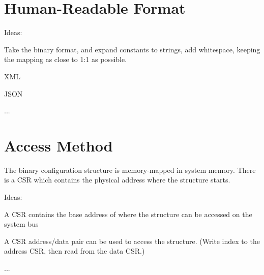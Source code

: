 \chapter{Human-Readable Format}

\begin{steps}{Ideas:}
\item Take the binary format, and expand constants to strings, add whitespace,
keeping the mapping as close to 1:1 as possible.
\item XML
\item JSON
\item ...
\end{steps}

\chapter{Access Method}
\label{sec:AccessMethod}

The binary configuration structure is memory-mapped in system memory. There
is a CSR which contains the physical address where the structure starts.

\begin{steps}{Ideas:}
\item A CSR contains the base address of where the structure can be accessed on
the system bus
\item A CSR address/data pair can be used to access the structure. (Write index
to the address CSR, then read from the data CSR.)
\item ...
\end{steps}
